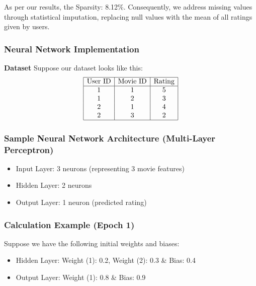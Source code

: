 \documentclass[a4paper]{article}
\theoremstyle{plain}
\theoremstyle{definition}
\begin{document}
As per our results, the Sparsity: 8.12\%. Consequently, we address missing values through statistical imputation, replacing null values with the mean of all ratings given by users.


\subsubsection{Neural Network Implementation}

\textbf{Dataset}
Suppose our dataset looks like this:
\[
\begin{array}{|c|c|c|}
\hline
\text{User ID} & \text{Movie ID} & \text{Rating} \\
\hline
1 & 1 & 5 \\
1 & 2 & 3 \\
2 & 1 & 4 \\
2 & 3 & 2 \\
\hline
\end{array}
\]

\subsubsection{Sample Neural Network Architecture (Multi-Layer Perceptron)}
\begin{itemize}
  \item Input Layer: 3 neurons (representing 3 movie features)
  \item Hidden Layer: 2 neurons
  \item Output Layer: 1 neuron (predicted rating)
\end{itemize}

\subsubsection{Calculation Example (Epoch 1)}
Suppose we have the following initial weights and biases:
\begin{itemize}
  \item Hidden Layer: Weight (1): 0.2, Weight (2): 0.3 \& Bias: 0.4
  \item Output Layer: Weight (1): 0.8 \& Bias: 0.9
\end{itemize}
\end{document}
